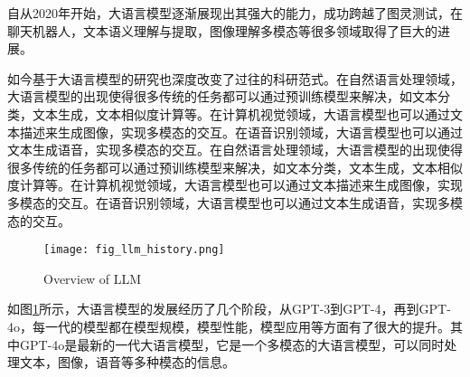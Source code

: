 自从2020年开始，大语言模型逐渐展现出其强大的能力，成功跨越了图灵测试，在聊天机器人，文本语义理解与提取，图像理解多模态等很多领域取得了巨大的进展。

如今基于大语言模型的研究也深度改变了过往的科研范式。在自然语言处理领域，大语言模型的出现使得很多传统的任务都可以通过预训练模型来解决，如文本分类，文本生成，文本相似度计算等。在计算机视觉领域，大语言模型也可以通过文本描述来生成图像，实现多模态的交互。在语音识别领域，大语言模型也可以通过文本生成语音，实现多模态的交互。在自然语言处理领域，大语言模型的出现使得很多传统的任务都可以通过预训练模型来解决，如文本分类，文本生成，文本相似度计算等。在计算机视觉领域，大语言模型也可以通过文本描述来生成图像，实现多模态的交互。在语音识别领域，大语言模型也可以通过文本生成语音，实现多模态的交互。

\begin{figure}[H]
    \texttt{[image: fig\_llm\_history.png]}
    \caption{Overview of LLM \cite{naveedComprehensiveOverviewLarge2024}}
    \label{fig:llm_history}
\end{figure}

如图\ref{fig:llm_history}所示，大语言模型的发展经历了几个阶段，从GPT-3到GPT-4，再到GPT-4o，每一代的模型都在模型规模，模型性能，模型应用等方面有了很大的提升。其中GPT-4o是最新的一代大语言模型，它是一个多模态的大语言模型，可以同时处理文本，图像，语音等多种模态的信息。